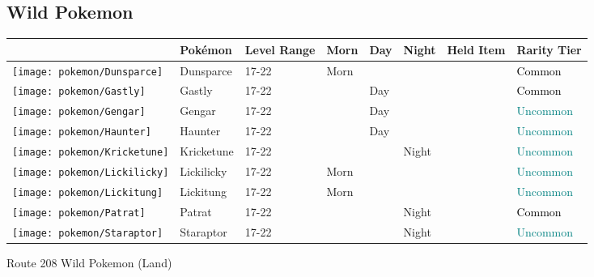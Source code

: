 \subsection{Wild Pokemon}%
\label{subsec:WildPokemon}%
\begin{longtable}{||l l l l l l l l||}%
\hline%
&Pokémon&Level Range&Morn&Day&Night&Held Item&Rarity Tier\\%
\hline%
\endhead%
\hline%
\texttt{[image: pokemon/Dunsparce]}&Dunsparce&17{-}22&Morn&&&&\textcolor{black}{%
Common%
}\\%
\hline%
\texttt{[image: pokemon/Gastly]}&Gastly&17{-}22&&Day&&&\textcolor{black}{%
Common%
}\\%
\hline%
\texttt{[image: pokemon/Gengar]}&Gengar&17{-}22&&Day&&&\textcolor{teal}{%
Uncommon%
}\\%
\hline%
\texttt{[image: pokemon/Haunter]}&Haunter&17{-}22&&Day&&&\textcolor{teal}{%
Uncommon%
}\\%
\hline%
\texttt{[image: pokemon/Kricketune]}&Kricketune&17{-}22&&&Night&&\textcolor{teal}{%
Uncommon%
}\\%
\hline%
\texttt{[image: pokemon/Lickilicky]}&Lickilicky&17{-}22&Morn&&&&\textcolor{teal}{%
Uncommon%
}\\%
\hline%
\texttt{[image: pokemon/Lickitung]}&Lickitung&17{-}22&Morn&&&&\textcolor{teal}{%
Uncommon%
}\\%
\hline%
\texttt{[image: pokemon/Patrat]}&Patrat&17{-}22&&&Night&&\textcolor{black}{%
Common%
}\\%
\hline%
\texttt{[image: pokemon/Staraptor]}&Staraptor&17{-}22&&&Night&&\textcolor{teal}{%
Uncommon%
}\\%
\hline%
\end{longtable}%
\caption{Route 208 Wild Pokemon (Land)}%
